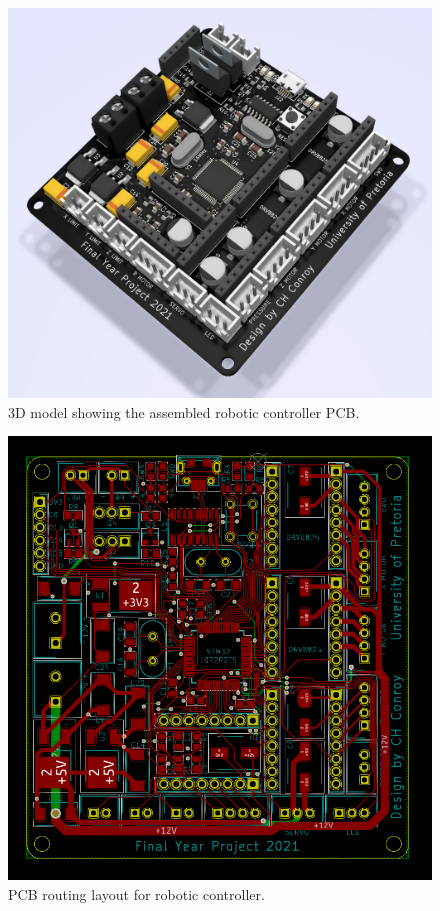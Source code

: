 \begin{figure}[H]
	\centering
	\includegraphics[width=0.7\linewidth]{figures/202109/robotic-controller-model.png}
	\caption{3D model showing the assembled robotic controller PCB.}
	\label{fig:robotic-controller-model}
\end{figure}

\begin{figure}[H]
	\centering
	\includegraphics[width=1\linewidth]{figures/202109/pcb-routing.PNG}
	\caption{PCB routing layout for robotic controller.}
	\label{fig:pcb-routing}
\end{figure}



